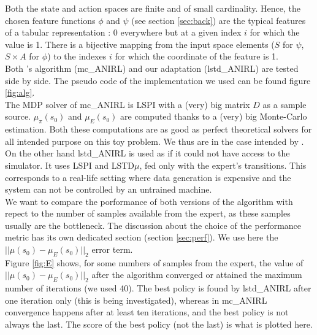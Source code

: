 \documentclass{article}
\begin{document}
Both the state and action spaces are finite and of small cardinality. Hence, the chosen feature functions $\phi$ and $\psi$ (see section \ref{sec:back}) are the typical features of a tabular representation : 0 everywhere but at a given index $i$ for which the value is 1. There is a bijective mapping from the input space elements ($S$ for $\psi$, $S \times A$ for $\phi$) to the indexes $i$ for which the coordinate of the feature is 1.\\

Both \citet{abbeel2004apprenticeship}'s algorithm (mc\_ANIRL) and our adaptation (lstd\_ANIRL) are tested side by side. The pseudo code of the implementation we used can be found figure \ref{fig:alg}.\\

The MDP solver of mc\_ANIRL is LSPI with a (very) big matrix $D$ as a sample source. $\mu_\pi(s_0)$ and $\mu_E(s_0)$ are computed thanks to a (very) big Monte-Carlo estimation. Both these computations are  as good as perfect theoretical solvers for all intended purpose on this toy problem. We thus are in the case intended by \citet{abbeel2004apprenticeship}.\\

On the other hand lstd\_ANIRL is used as if it could not have access to the simulator. It uses LSPI and LSTD$\mu$, fed only with the expert's transitions. This corresponds to a real-life setting where data generation is expensive and the system can not be controlled by an untrained machine.\\

We want to compare the porformance of both versions of the algorithm with repect to the number of samples available from the expert, as these samples usually are the bottleneck. The discussion about the choice of the performance metric has its own dedicated section (section \ref{sec:perf}). We use here the $||\mu(s_0) - \mu_E(s_0)||_2$ error term.\\

Figure \ref{fig:E} shows, for some numbers of samples from the expert, the value of $||\mu(s_0)-\mu_E(s_0)||_2$ after the algorithm converged or attained the maximum number of iterations (we used 40). The best policy is found by lstd\_ANIRL after one iteration only (this is being investigated), whereas in mc\_ANIRL convergence happens after at least ten iterations, and the best policy is not always the last. The score of the best policy (not the last) is what is plotted here.\\
\end{document}
